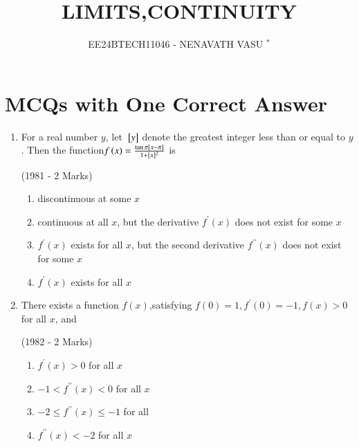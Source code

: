 \documentclass[journal,12pt,onecolumn]{IEEEtran}
\theoremstyle{remark}
\begin{document}

\vspace{3cm}

\title{LIMITS,CONTINUITY}
\author{EE24BTECH11046 - NENAVATH VASU $^{*}$%
}
\maketitle
\bigskip

\renewcommand{\thefigure}{\theenumi}
\renewcommand{\thetable}{\theenumi}


\section{ MCQs with One Correct Answer}



\begin{enumerate}
   
\item For a real number $y$, let ${}\left[y\right]$ denote the greatest integer less than or equal to $y$. Then the function{$f\left(x\right)=\frac{\tan\pi{}\left[x-\pi\right]}{1+[x]^2}$} is

\hfill                    (1981 - 2 Marks)
   \begin{enumerate}
       \item discontinuous at some $x$
        \item continuous at all $x$, but the derivative $f^{\prime}(x)$ does not exist for some $x$
        \item $f^{\prime}(x)$ exists for all $x$, but the second derivative $f^{\prime\prime}(x)$ does not exist for some $x$
        \item $f^{\prime}(x)$ exists for all $x$
   \end{enumerate}




\item There exists a function $f(x)$,satisfying $f(0)=1, f^{\prime}(0)=-1, f(x)>0$ for all $x$, and 

\hfill      (1982 - 2 Marks)
    \begin{enumerate}

          \item $f^{\prime}(x) > 0$ for all $x$
          \item$ -1 < f^{\prime\prime}(x) < 0$ for all $x$
          \item $-2 \leq f^{\prime\prime}(x) \leq -1$ for  all 
          \item $f^{\prime\prime}(x) < -2$ for all $x$


\end{enumerate}
\end{enumerate}
\end{document}
